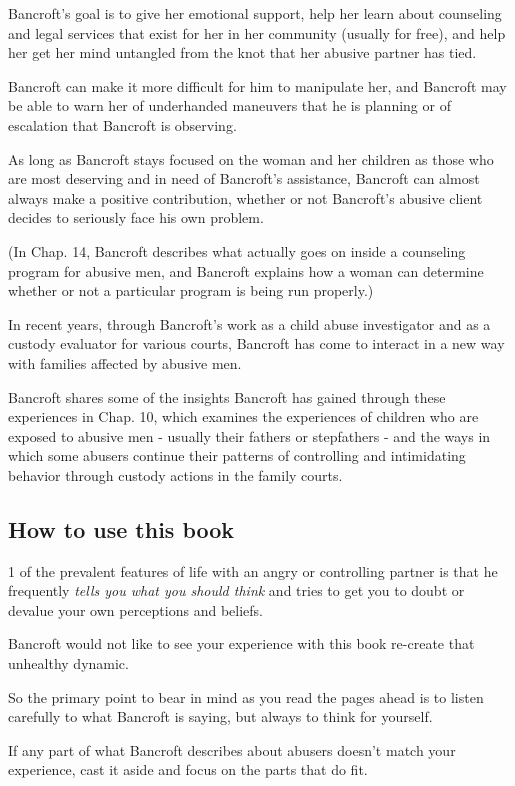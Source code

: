 \documentclass[oneside]{article}
\numberwithin{equation}{section}
\begin{document}
Bancroft's goal is to give her emotional support, help her learn about counseling and legal services that exist for her in her community (usually for free), and help her get her mind untangled from the knot that her abusive partner has tied.

Bancroft can make it more difficult for him to manipulate her, and Bancroft may be able to warn her of underhanded maneuvers that he is planning or of escalation that Bancroft is observing.

As long as Bancroft stays focused on the woman and her children as those who are most deserving and in need of Bancroft's assistance, Bancroft can almost always make a positive contribution, whether or not Bancroft's abusive client decides to seriously face his own problem.

(In Chap. 14, Bancroft describes what actually goes on inside a counseling program for abusive men, and Bancroft explains how a woman can determine whether or not a particular program is being run properly.)

%
In recent years, through Bancroft's work as a child abuse investigator and as a custody evaluator for various courts, Bancroft has come to interact in a new way with families affected by abusive men.

Bancroft shares some of the insights Bancroft has gained through these experiences in Chap. 10, which examines the experiences of children who are exposed to abusive men - usually their fathers or stepfathers - and the ways in which some abusers continue their patterns of controlling and intimidating behavior through custody actions in the family courts.

\subsection{How to use this book}
1 of the prevalent features of life with an angry or controlling partner is that he frequently \textit{tells you what you should think} and tries to get you to doubt or devalue your own perceptions and beliefs.

Bancroft would not like to see your experience with this book re-create that unhealthy dynamic.

So the primary point to bear in mind as you read the pages ahead is to listen carefully to what Bancroft is saying, but always to think for yourself.

If any part of what Bancroft describes about abusers doesn't match your experience, cast it aside and focus on the parts that do fit.
\end{document}
